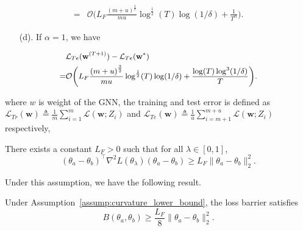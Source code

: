 \begin{lemma}
\begin{equation*}
\begin{aligned}
            = & \mathcal{O} \bigg( L_F \frac{{(m+u)}^{\frac{3}{2}}}{mu} \log^{\frac{1}{2}}(T) \log (1/\delta) + \frac{1}{T^\alpha} \bigg).
        \end{aligned}
        \end{equation*}
        \begin{itemize}
        \item[(d).] If $\alpha = 1$, we have
        \end{itemize}
        \begin{equation*}\small
        \begin{aligned}
             & \mathcal{L}_{Te}(\mathbf{w}^{(T+1)}) - \mathcal{L}_{Te}(\mathbf{w}^*) \\
             = & \mathcal{O} \bigg( L_F \frac{{(m+u)}^{\frac{3}{2}}}{mu} \log^{\frac{1}{2}}(T) \log (1/\delta) + \frac{\log(T) \log^3 (1/\delta)}{T} \bigg).
        \end{aligned}
        \end{equation*}
\end{lemma}
where  $w$ is weight of the GNN, the training and test error is defined as $\mathcal{L}_{Tr}(\mathbf{w}) \triangleq \frac{1}{m}\sum_{i=1}^{m} \mathcal{L} (\mathbf{w}; Z_i)$ and $\mathcal{L}_{Te}(\mathbf{w}) \triangleq \frac{1}{u}\sum_{i=m+1}^{m+u} \mathcal{L} (\mathbf{w}; Z_i)$ respectively,

\begin{assumption}
\label{assump:curvature_lower_bound}
There exists a constant \( L_F > 0 \) such that for all \( \lambda \in [0,1] \),
\[
(\theta_a - \theta_b)^\top \nabla^2 L(\theta_\lambda) (\theta_a - \theta_b) \ge L_F \|\theta_a - \theta_b\|_2^2.
\]
\end{assumption}

Under this assumption, we have the following result.

\begin{lemma}
\label{thm:loss_barrier_lower_bound}
Under Assumption~\ref{assump:curvature_lower_bound}, the loss barrier satisfies
\[
B(\theta_a,\theta_b) \ge \frac{L_F}{8}\|\theta_a-\theta_b\|_2^2.
\]
\end{lemma}


